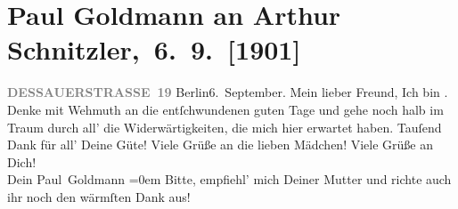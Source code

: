 

         
         \renewcommand{\erwaehntePersonen}{Personen: Paul Goldmann, Olga Schnitzler, Louise Schnitzler, Elisabeth Steinrück}
         \renewcommand{\erwaehnteOrte}{Orte: Berlin, Dessauer Straße, Wien}
         \renewcommand{\erwaehnteWerke}{}
               \section[ Paul Goldmann an Arthur Schnitzler, 6. 9. {[}1901{]}]{ Paul Goldmann an Arthur Schnitzler, 6. 9. {[}1901{]}}\nopagebreak{}\rehead{ }\begin{ledgroupsized}[t]{13cm}\normalsize\beginnumbering \toendnotes[C]{\smallbreak\pagebreak[2]} 
\toendnotes[C]{\smallbreak}\pstart
           \noindent{}\raggedleft{}{\pb}\textcolor{gray}{\textbf{DESSAUERSTRASSE 19}}\pend
           \pstart
           Berlin6. September.\pend
           \pstart\center{}Mein lieber Freund,\pend\pstart
           Ich bin \label{K_L03081-1v}\label{K_L03081-1h}. Denke mit Wehmuth an die
               entſchwundenen guten Tage und gehe noch halb im Traum durch all’ die
               Widerwärtigkeiten, die mich hier erwartet haben. Tauſend Dank für all’ Deine Güte!
               Viele Grüße an die lieben Mädchen!\pend
           \pstart
           Viele Grüße an Dich! {\\[\baselineskip]}Dein \spacefill\mbox{Paul Goldmann}\pend
           \leftskip=0em{}\pstart
           \noindent{}Bitte, empfiehl’ mich Deiner Mutter und richte auch ihr noch den wärmſten Dank aus!\pend
           
         
         \endnumbering{}\end{ledgroupsized}  \newcommand{\dateiname}{L03081}\newcommand{\titel}{Paul Goldmann an Arthur Schnitzler, 6. 9. [1901]}\newcommand{\editorInnen}{Martin Anton Müller und Laura Untner}
      
